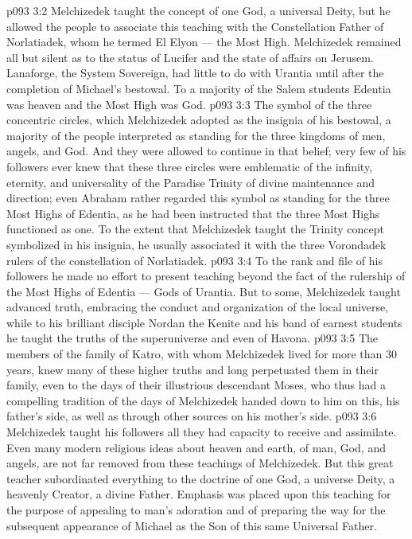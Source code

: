 \vs p093 3:2 Melchizedek taught the concept of one God, a universal Deity, but he allowed the people to associate this teaching with the Constellation Father of Norlatiadek, whom he termed El Elyon --- the Most High. Melchizedek remained all but silent as to the status of Lucifer and the state of affairs on Jerusem. Lanaforge, the System Sovereign, had little to do with Urantia until after the completion of Michael’s bestowal. To a majority of the Salem students Edentia was heaven and the Most High was God.
\vs p093 3:3 The symbol of the three concentric circles, which Melchizedek adopted as the insignia of his bestowal, a majority of the people interpreted as standing for the three kingdoms of men, angels, and God. And they were allowed to continue in that belief; very few of his followers ever knew that these three circles were emblematic of the infinity, eternity, and universality of the Paradise Trinity of divine maintenance and direction; even Abraham rather regarded this symbol as standing for the three Most Highs of Edentia, as he had been instructed that the three Most Highs functioned as one. To the extent that Melchizedek taught the Trinity concept symbolized in his insignia, he usually associated it with the three Vorondadek rulers of the constellation of Norlatiadek.
\vs p093 3:4 To the rank and file of his followers he made no effort to present teaching beyond the fact of the rulership of the Most Highs of Edentia --- Gods of Urantia. But to some, Melchizedek taught advanced truth, embracing the conduct and organization of the local universe, while to his brilliant disciple Nordan the Kenite and his band of earnest students he taught the truths of the superuniverse and even of Havona.
\vs p093 3:5 The members of the family of Katro, with whom Melchizedek lived for more than 30 years, knew many of these higher truths and long perpetuated them in their family, even to the days of their illustrious descendant Moses, who thus had a compelling tradition of the days of Melchizedek handed down to him on this, his father’s side, as well as through other sources on his mother’s side.
\vs p093 3:6 Melchizedek taught his followers all they had capacity to receive and assimilate. Even many modern religious ideas about heaven and earth, of man, God, and angels, are not far removed from these teachings of Melchizedek. But this great teacher subordinated everything to the doctrine of one God, a universe Deity, a heavenly Creator, a divine Father. Emphasis was placed upon this teaching for the purpose of appealing to man’s adoration and of preparing the way for the subsequent appearance of Michael as the Son of this same Universal Father.
